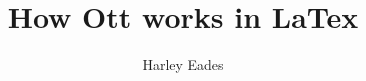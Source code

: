 \documentclass{article}
\begin{document}
\title{How Ott works in LaTex}

\author{Harley Eades}

\date{}

\maketitle

\end{document}
